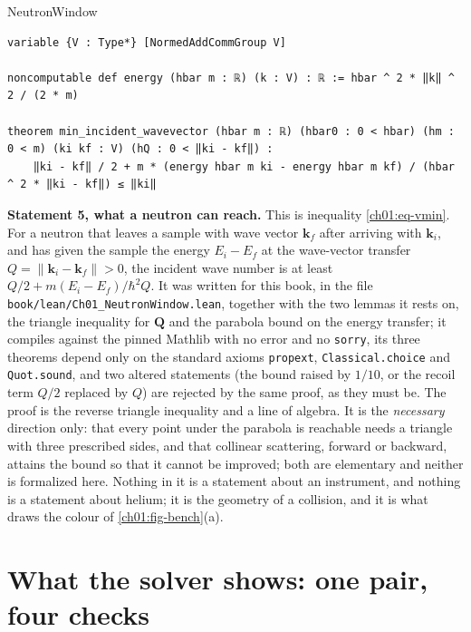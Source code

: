 \begin{leanbox}[title={Lean 4 \enspace Statement 5 \enspace NeutronWindow (new in this book)}]{NeutronWindow}
\begin{lstlisting}[style=lean,basicstyle=\ttfamily\footnotesize]
variable {V : Type*} [NormedAddCommGroup V]

noncomputable def energy (hbar m : ℝ) (k : V) : ℝ := hbar ^ 2 * ‖k‖ ^ 2 / (2 * m)

theorem min_incident_wavevector (hbar m : ℝ) (hbar0 : 0 < hbar) (hm : 0 < m) (ki kf : V) (hQ : 0 < ‖ki - kf‖) :
    ‖ki - kf‖ / 2 + m * (energy hbar m ki - energy hbar m kf) / (hbar ^ 2 * ‖ki - kf‖) ≤ ‖ki‖
\end{lstlisting}
\end{leanbox}
\textbf{Statement 5, what a neutron can reach.} This is inequality \eqref{ch01:eq-vmin}. For a neutron that leaves a sample with wave vector $\mathbf k_f$ after arriving with $\mathbf k_i$, and has given the sample the energy $E_i-E_f$ at the wave-vector transfer $Q=\|\mathbf k_i-\mathbf k_f\|>0$, the incident wave number is at least $Q/2+m(E_i-E_f)/\hbar^2Q$. It was written for this book, in the file \texttt{book/lean/Ch01\_NeutronWindow.lean}, together with the two lemmas it rests on, the triangle inequality for $\mathbf Q$ and the parabola bound on the energy transfer; it compiles against the pinned Mathlib with no error and no \texttt{sorry}, its three theorems depend only on the standard axioms \texttt{propext}, \texttt{Classical.choice} and \texttt{Quot.sound}, and two altered statements (the bound raised by $1/10$, or the recoil term $Q/2$ replaced by $Q$) are rejected by the same proof, as they must be. The proof is the reverse triangle inequality and a line of algebra. It is the \emph{necessary} direction only: that every point under the parabola is reachable needs a triangle with three prescribed sides, and that collinear scattering, forward or backward, attains the bound so that it cannot be improved; both are elementary and neither is formalized here. Nothing in it is a statement about an instrument, and nothing is a statement about helium; it is the geometry of a collision, and it is what draws the colour of \cref{ch01:fig-bench}(a).

\section{What the solver shows: one pair, four checks}\label{ch01:sec-solver}

